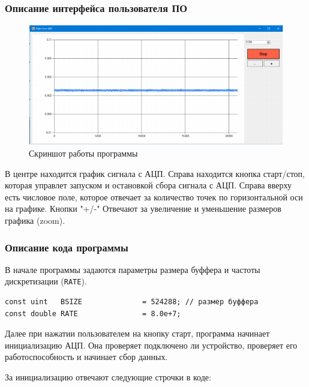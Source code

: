 \documentclass[../paper.tex]{subfiles}
\begin{document}
\subsubsection{Описание интерфейса пользователя ПО} 
\begin{figure}[H]
\centering
\includegraphics[width=\textwidth]{images/screenshot.png}
\caption{Скриншот работы программы}
\end{figure}
В центре находится график сигнала с АЦП. Справа находится кнопка старт/стоп, которая управлет запуском и остановкой сбора сигнала с АЦП. Справа вверху есть числовое поле, которое отвечает за количество точек по горизонтальной оси на графике. Кнопки "+/-" Отвечают за увеличение и уменьшение размеров графика (zoom).

\subsubsection{Описание кода программы}
В начале программы задаются параметры размера буффера и частоты дискретизации (\verb|RATE|).
\begin{verbatim}
const uint   BSIZE              = 524288; // размер буффера
const double RATE               = 8.0e+7;
\end{verbatim}

Далее при нажатии пользователем на кнопку старт, программа начинает инициализацию АЦП. Она проверяет подключено ли устройство, проверяет его работоспособность и начинает сбор данных.

За инициализацию отвечают следующие строчки в коде:
\end{document}
